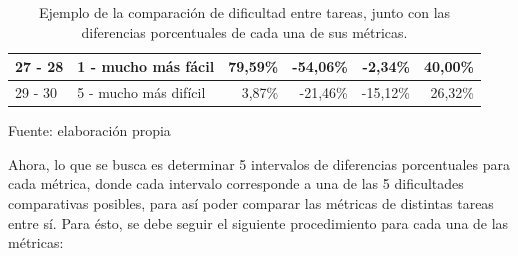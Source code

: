 \documentclass[letterpaper,12pt]{article}
\begin{document}
\begin{table}[H]
\begin{tabular}{|l|l|r|r|r|r|}
    27 - 28         & 1 - mucho más fácil                                                            & 79,59\%                                                                                                   & -54,06\%                                                                                       & -2,34\%                                                                                   & 40,00\%                                                                                  \\ \hline
    29 - 30         & 5 - mucho más difícil                                                          & 3,87\%                                                                                                    & -21,46\%                                                                                       & -15,12\%                                                                                  & 26,32\%                                                                                  \\ \hline
  \end{tabular}
  \caption{Ejemplo de la comparación de dificultad entre tareas, junto con las diferencias porcentuales de cada una de sus métricas.} Fuente: elaboración propia
  \label{tab:example-tasks-comparision}
\end{table}

Ahora, lo que se busca es determinar 5 intervalos de diferencias porcentuales para cada métrica, donde cada intervalo corresponde a una de las 5 dificultades comparativas posibles, para así poder comparar las métricas de distintas tareas entre sí. Para ésto, se debe seguir el siguiente procedimiento para cada una de las métricas:
\end{document}
